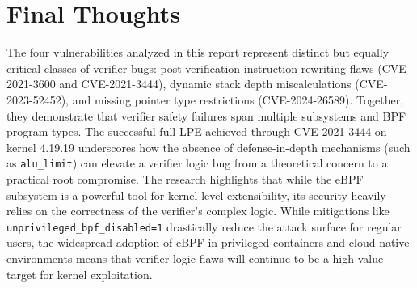 \section{Final Thoughts}
The four vulnerabilities analyzed in this report represent distinct but equally critical classes of verifier bugs: post-verification instruction rewriting flaws (CVE-2021-3600 and CVE-2021-3444), dynamic stack depth miscalculations (CVE-2023-52452), and missing pointer type restrictions (CVE-2024-26589). Together, they demonstrate that verifier safety failures span multiple subsystems and BPF program types. The successful full LPE achieved through CVE-2021-3444 on kernel 4.19.19 underscores how the absence of defense-in-depth mechanisms (such as \texttt{alu\_limit}) can elevate a verifier logic bug from a theoretical concern to a practical root compromise. The research highlights that while the eBPF subsystem is a powerful tool for kernel-level extensibility, its security heavily relies on the correctness of the verifier's complex logic. While mitigations like \texttt{unprivileged\_bpf\_disabled=1} drastically reduce the attack surface for regular users, the widespread adoption of eBPF in privileged containers and cloud-native environments means that verifier logic flaws will continue to be a high-value target for kernel exploitation.
